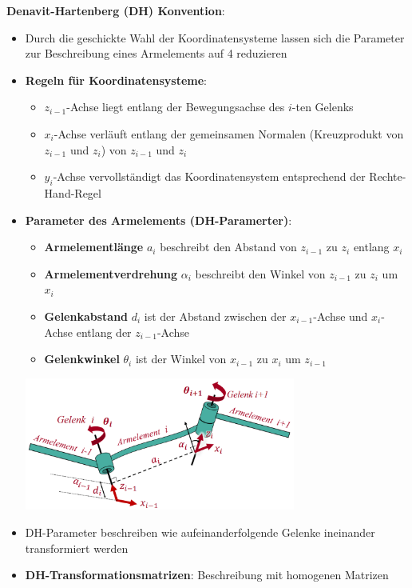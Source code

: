 \textbf{Denavit-Hartenberg (DH) Konvention}:
\begin{itemize}
	\item Durch die geschickte Wahl der Koordinatensysteme lassen sich die Parameter zur Beschreibung eines Armelements auf 4 reduzieren
	\item \textbf{Regeln für Koordinatensysteme}:
	\begin{itemize}
		\item $z_{i-1}$-Achse liegt entlang der Bewegungsachse des $i$-ten Gelenks
		\item $x_i$-Achse verläuft entlang der gemeinsamen Normalen (Kreuzprodukt von $z_{i-1}$ und $z_i$) von $z_{i-1}$ und $z_i$
		\item $y_i$-Achse vervollständigt das Koordinatensystem entsprechend der Rechte-Hand-Regel
	\end{itemize}
	\item \textbf{Parameter des Armelements (DH-Paramerter)}:
	\begin{itemize}
		\item \textbf{Armelementlänge} $a_i$ beschreibt den Abstand von $z_{i-1}$ zu $z_i$ entlang $x_i$
		\item \textbf{Armelementverdrehung} $\alpha_i$ beschreibt den Winkel von $z_{i-1}$ zu $z_i$ um $x_i$
		\item \textbf{Gelenkabstand} $d_i$ ist der Abstand zwischen der $x_{i-1}$-Achse und $x_i$-Achse entlang der $z_{i-1}$-Achse
		\item \textbf{Gelenkwinkel} $\theta_i$ ist der Winkel von $x_{i-1}$ zu $x_i$ um $z_{i-1}$
	\end{itemize}
	\begin{center}
		\includegraphics[width=0.7\textwidth]{images/dh.png}
	\end{center}
	\item DH-Parameter beschreiben wie aufeinanderfolgende Gelenke ineinander transformiert werden
	\item \textbf{DH-Transformationsmatrizen}: Beschreibung mit homogenen Matrizen
	\begin{enumerate}

\end{enumerate}
\end{itemize}
